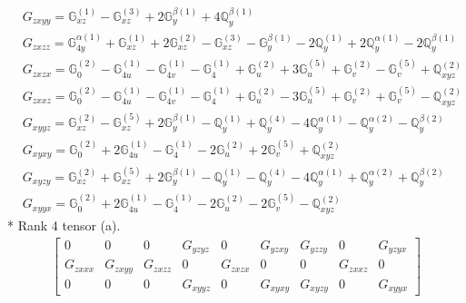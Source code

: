 \documentclass[fleqn,8pt,landscape]{jsarticle}
\begin{document}
\begin{align*}
& G_{zxyy} = \mathbb{G}_{xz}^{(1)} - \mathbb{G}_{xz}^{(3)} + 2 \mathbb{G}_{y}^{\beta(1)} + 4 \mathbb{Q}_{y}^{\beta(1)} \\
& G_{zxzz} = \mathbb{G}_{4y}^{\alpha(1)} + \mathbb{G}_{xz}^{(1)} + 2 \mathbb{G}_{xz}^{(2)} - \mathbb{G}_{xz}^{(3)} - \mathbb{G}_{y}^{\beta(1)} - 2 \mathbb{Q}_{y}^{(1)} + 2 \mathbb{Q}_{y}^{\alpha(1)} - 2 \mathbb{Q}_{y}^{\beta(1)} \\
& G_{zxzx} = \mathbb{G}_{0}^{(2)} - \mathbb{G}_{4u}^{(1)} - \mathbb{G}_{4v}^{(1)} - \mathbb{G}_{4}^{(1)} + \mathbb{G}_{u}^{(2)} + 3 \mathbb{G}_{u}^{(5)} + \mathbb{G}_{v}^{(2)} - \mathbb{G}_{v}^{(5)} + \mathbb{Q}_{xyz}^{(2)} \\
& G_{zxxz} = \mathbb{G}_{0}^{(2)} - \mathbb{G}_{4u}^{(1)} - \mathbb{G}_{4v}^{(1)} - \mathbb{G}_{4}^{(1)} + \mathbb{G}_{u}^{(2)} - 3 \mathbb{G}_{u}^{(5)} + \mathbb{G}_{v}^{(2)} + \mathbb{G}_{v}^{(5)} - \mathbb{Q}_{xyz}^{(2)} \\
& G_{xyyz} = \mathbb{G}_{xz}^{(2)} - \mathbb{G}_{xz}^{(5)} + 2 \mathbb{G}_{y}^{\beta(1)} - \mathbb{Q}_{y}^{(1)} + \mathbb{Q}_{y}^{(4)} - 4 \mathbb{Q}_{y}^{\alpha(1)} - \mathbb{Q}_{y}^{\alpha(2)} - \mathbb{Q}_{y}^{\beta(2)} \\
& G_{xyxy} = \mathbb{G}_{0}^{(2)} + 2 \mathbb{G}_{4u}^{(1)} - \mathbb{G}_{4}^{(1)} - 2 \mathbb{G}_{u}^{(2)} + 2 \mathbb{G}_{v}^{(5)} + \mathbb{Q}_{xyz}^{(2)} \\
& G_{xyzy} = \mathbb{G}_{xz}^{(2)} + \mathbb{G}_{xz}^{(5)} + 2 \mathbb{G}_{y}^{\beta(1)} - \mathbb{Q}_{y}^{(1)} - \mathbb{Q}_{y}^{(4)} - 4 \mathbb{Q}_{y}^{\alpha(1)} + \mathbb{Q}_{y}^{\alpha(2)} + \mathbb{Q}_{y}^{\beta(2)} \\
& G_{xyyx} = \mathbb{G}_{0}^{(2)} + 2 \mathbb{G}_{4u}^{(1)} - \mathbb{G}_{4}^{(1)} - 2 \mathbb{G}_{u}^{(2)} - 2 \mathbb{G}_{v}^{(5)} - \mathbb{Q}_{xyz}^{(2)}
\end{align*}
* Rank 4 tensor (a).
\begin{align*}
\begin{bmatrix} 0 & 0 & 0 & G_{yzyz} & 0 & G_{yzxy} & G_{yzzy} & 0 & G_{yzyx} \\ G_{zxxx} & G_{zxyy} & G_{zxzz} & 0 & G_{zxzx} & 0 & 0 & G_{zxxz} & 0 \\ 0 & 0 & 0 & G_{xyyz} & 0 & G_{xyxy} & G_{xyzy} & 0 & G_{xyyx} \end{bmatrix}
\end{align*}
\end{document}
